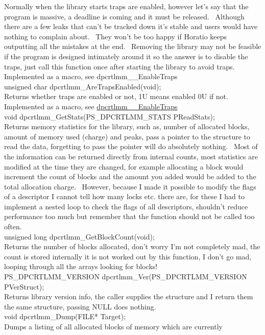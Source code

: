 \documentclass{article}
\begin{document}
Normally when the library starts traps are enabled, however let's say
that the program is massive, a deadline is coming and it must be
released.~
Although there are a few leaks that can't be tracked down it's stable
and
users would have nothing to complain about.~ They won't be too
happy
if Horatio keeps outputting all the mistakes at the end.~
Removing
the library may not be feasible if the program is designed intimately
around
it so the answer is to disable the traps, just call this function once
after starting the library to avoid traps.~ Implemented as a
macro,
see dpcrtlmm\_\_EnableTraps
\\
unsigned char dpcrtlmm\_AreTrapsEnabled(void);
\\
Returns whether traps are enabled or not, 1U means enabled 0U if
not.~
Implemented as a macro, see \href{#_EnableTraps}{dpcrtlmm\_\_EnableTraps}
\\
void dpcrtlmm\_GetStats(PS\_DPCRTLMM\_STATS
PReadStats);
\\
Returns memory statistics for the library, such as, number of allocated
blocks, amount of memory used (charge) and peaks, pass a pointer to the
structure to read the data, forgetting to pass the pointer will do
absolutely
nothing.~ Most of the information can be returned directly from
internal
counts, most statistics are modified at the time they are changed, for
example allocating a block would increment the count of blocks and the
amount you added would be added to the total allocation charge.~
However,
because I made it possible to modify the flags of a descriptor I cannot
tell how many locks etc. there are, for these I had to implement a
nested
loop to check the flags of all descriptors, shouldn't reduce
performance
too much but remember that the function should not be called too often.
\\
unsigned long dpcrtlmm\_GetBlockCount(void);
\\
Returns the number of blocks allocated, don't worry I'm not completely
mad, the count is stored internally it is not worked out by this
function,
I don't go mad, looping through all the arrays looking for blocks!
\\
PS\_DPCRTLMM\_VERSION
dpcrtlmm\_Ver(PS\_DPCRTLMM\_VERSION
PVerStruct);
\\
Returns library version info, the caller supplies the structure and
I return them the same structure, passing NULL does nothing.
\\
void dpcrtlmm\_Dump(FILE* Target);
\\
Dumps a listing of all allocated blocks of memory which are currently
\end{document}
